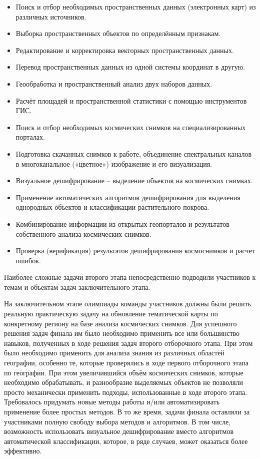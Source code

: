 \begin{itemize}
    \item Поиск и отбор необходимых пространственных данных (электронных карт) из различных источников.
    \item Выборка пространственных объектов по определённым признакам.
    \item Редактирование и корректировка векторных пространственных данных.
    \item Перевод пространственных данных из одной системы координат в другую.
    \item Геообработка и пространственный анализ двух наборов данных.
    \item Расчёт площадей и пространственной статистики с помощью инструментов ГИС.
    \item Поиск и отбор необходимых космических снимков на специализированных порталах.
    \item Подготовка скачанных снимков к работе, объединение спектральных каналов в многоканальное («цветное») изображение и его визуализация.
    \item Визуальное дешифрирование – выделение объектов на космических снимках.
    \item Применение автоматических алгоритмов дешифрирования для выделения однородных объектов и классификации растительного покрова.
    \item Комбинирование информации из открытых геопорталов и результатов собственного анализа космических снимков.
    \item Проверка (верификация) результатов дешифрирования космоснимков и расчет ошибок.
\end{itemize}

Наиболее сложные задачи второго этапа непосредственно подводили участников к темам и объектам задач заключительного этапа.

На заключительном этапе олимпиады команды участников должны были решить реальную практическую задачу на обновление тематической карты по конкретному региону на базе анализа космических снимков. Для успешного решения задач финала им было необходимо применить все или большинство навыков, полученных в ходе решения задач второго отборочного этапа. При этом было необходимо применить для анализа знания из различных областей географии, особенно те, которые проверялись в ходе первого отборочного этапа по географии. При этом увеличившийся объём космических снимков, которые необходимо обрабатывать, и разнообразие выделяемых объектов не позволяли просто механически применить подходы, использованные в ходе второго этапа. Требовалось придумать новые методы работы и/или автоматизировать применение более простых методов. В то же время, задачи финала оставляли за участниками полную свободу выбора методов и алгоритмов. В том числе, возможность использовать визуальное дешифрирование вместо алгоритмов автоматической классификации, которое, в ряде случаев, может оказаться более эффективно.